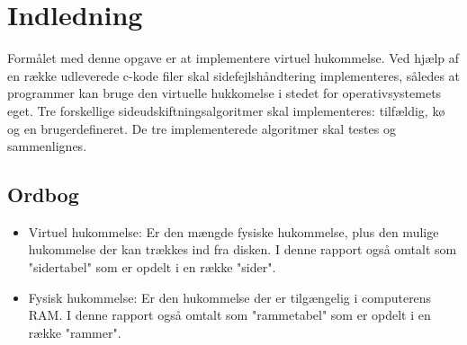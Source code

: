 \section{Indledning}
Formålet med denne opgave er at implementere virtuel hukommelse. Ved hjælp af en række udleverede c-kode filer skal sidefejlshåndtering implementeres, således at programmer kan bruge den virtuelle hukkomelse i stedet for operativsystemets eget. Tre forskellige sideudskiftningsalgoritmer skal implementeres: tilfældig, kø og en brugerdefineret. De tre implementerede algoritmer skal testes og sammenlignes.

\subsection{Ordbog}
\begin{itemize}
	\item Virtuel hukommelse: Er den mængde fysiske hukommelse, plus den mulige hukommelse der kan trækkes ind fra disken. I denne rapport også omtalt som "sidertabel" som er opdelt i en række "sider".
	\item Fysisk hukommelse: Er den hukommelse der er tilgængelig i computerens RAM. I denne rapport også omtalt som "rammetabel" som er opdelt i en række "rammer".
\end{itemize}
